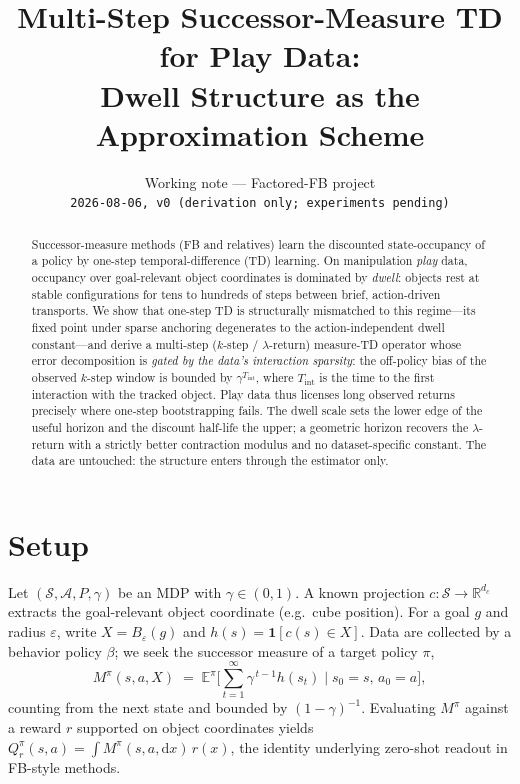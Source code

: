 \documentclass{article}
\title{Multi-Step Successor-Measure TD for Play Data:\\
Dwell Structure as the Approximation Scheme}
\author{Working note --- Factored-FB project\\
\texttt{2026-08-06, v0 (derivation only; experiments pending)}}
\newcommand{\M}{M}
\providecommand{\E}{\mathbb{E}}
\newcommand{\ind}[1]{\mathbf{1}\!\left[#1\right]}
\begin{document}
\maketitle

\begin{abstract}
Successor-measure methods (FB and relatives) learn the discounted state-occupancy
of a policy by one-step temporal-difference (TD) learning. On manipulation
\emph{play} data, occupancy over goal-relevant object coordinates is dominated by
\emph{dwell}: objects rest at stable configurations for tens to hundreds of steps
between brief, action-driven transports. We show that one-step TD is structurally
mismatched to this regime---its fixed point under sparse anchoring degenerates to
the action-independent dwell constant---and derive a multi-step (\(k\)-step /
\(\lambda\)-return) measure-TD operator whose error decomposition is
\emph{gated by the data's interaction sparsity}: the off-policy bias of the
observed \(k\)-step window is bounded by \(\gamma^{T_{\mathrm{int}}}\), where
\(T_{\mathrm{int}}\) is the time to the first interaction with the tracked
object. Play data thus licenses long observed returns precisely where one-step
bootstrapping fails. The dwell scale sets the lower edge of the useful horizon
and the discount half-life the upper; a geometric horizon recovers the
\(\lambda\)-return with a strictly better contraction modulus and no
dataset-specific constant. The data are untouched: the structure enters through
the estimator only.
\end{abstract}

\section{Setup}

Let \((\mathcal{S},\mathcal{A},P,\gamma)\) be an MDP with \(\gamma\in(0,1)\).
A known projection \(c:\mathcal{S}\to\mathbb{R}^{d_c}\) extracts the
goal-relevant object coordinate (e.g.\ cube position). For a goal \(g\) and
radius \(\varepsilon\), write \(X=B_\varepsilon(g)\) and
\(h(s)=\ind{c(s)\in X}\). Data are collected by a behavior policy \(\beta\); we
seek the successor measure of a target policy \(\pi\),
\begin{equation}
\M^\pi(s,a,X)\;=\;\E^\pi\!\Big[\textstyle\sum_{t=1}^{\infty}\gamma^{\,t-1}h(s_t)\;\Big|\;s_0=s,\,a_0=a\Big],
\label{eq:measure}
\end{equation}
counting from the next state and bounded by \((1-\gamma)^{-1}\). Evaluating
\(\M^\pi\) against a reward \(r\) supported on object coordinates yields
\(Q^\pi_r(s,a)=\int \M^\pi(s,a,\mathrm{d}x)\,r(x)\), the identity underlying
zero-shot readout in FB-style methods.
\end{document}
